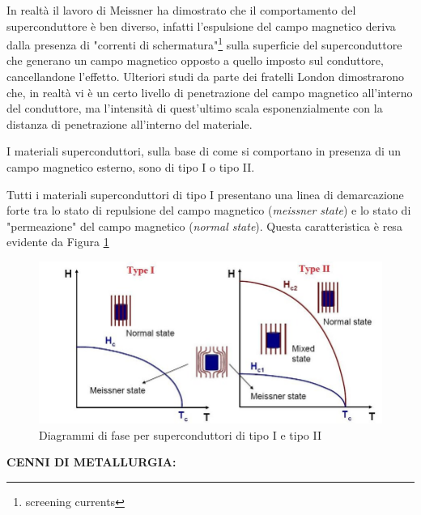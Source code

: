 \documentclass[a4paper,10pt]{article}
\begin{document}
In realtà il lavoro di Meissner ha dimostrato che il comportamento del superconduttore è ben
diverso, infatti l'espulsione del campo magnetico deriva dalla presenza di "correnti di
schermatura"\footnote{screening currents} sulla superficie del superconduttore che generano un
campo magnetico opposto a quello imposto sul conduttore, cancellandone
l'effetto\cite{super-fundamentals}. Ulteriori studi da parte dei fratelli London dimostrarono che,
in realtà vi è un certo livello di penetrazione del campo magnetico all'interno del conduttore, ma
l'intensità di quest'ultimo scala esponenzialmente con la distanza di penetrazione all'interno del
materiale\cite{ssp}.

I materiali superconduttori, sulla base di come si comportano in presenza di un campo magnetico
esterno, sono di tipo I o tipo II.

Tutti i materiali superconduttori di tipo I presentano una linea di demarcazione forte tra lo stato
di repulsione del campo magnetico (\emph{meissner state}) e lo stato di "permeazione" del campo
magnetico (\emph{normal state}). Questa
caratteristica è resa evidente da Figura \ref{fig:phase-diagram}
\begin{figure}[h!]
	\centering

	\includegraphics[scale=0.35]{fig/phase-diagram.jpg}
	\caption{
		Diagrammi di fase per superconduttori di tipo I e tipo
		II\cite{super-types}
	}\label{fig:phase-diagram}
\end{figure}

\bigskip
{}
\label{sec:metallurgy}
\noindent
\textbf{CENNI DI METALLURGIA:}

\clearpage

\printbibliography
\end{document}
